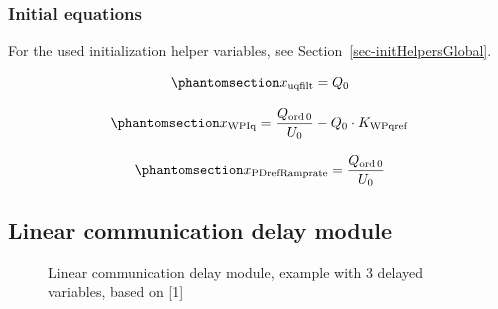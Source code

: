 \documentclass[
  a4paper,
  DIV=11,
  numbers=noendperiod]{scrartcl}
\begin{document}
\subsubsection{Initial equations}\label{initial-equations-7}

For the used initialization helper variables, see
Section~\ref{sec-initHelpersGlobal}.

\begin{equation}\phantomsection\label{eq-initXuqfilt}{
x_\mathrm{uqfilt} = Q_0
}\end{equation}

\begin{equation}\phantomsection\label{eq-initXwpiq}{
x_\mathrm{WPIq} = \frac{Q_\mathrm{ord\,0}}{U_0} - Q_0 \cdot K_\mathrm{WPqref}
}\end{equation}

\begin{equation}\phantomsection\label{eq-initXpdreframprate}{
x_\mathrm{PDrefRamprate} = \frac{Q_\mathrm{ord\,0}}{U_0}
}\end{equation}

\subsection{Linear communication delay
module}\label{linear-communication-delay-module}

\begin{figure}


\caption{\label{fig-wpCommunication}Linear communication delay module,
example with 3 delayed variables, based on {[}1{]}}

\end{figure}%
\end{document}
